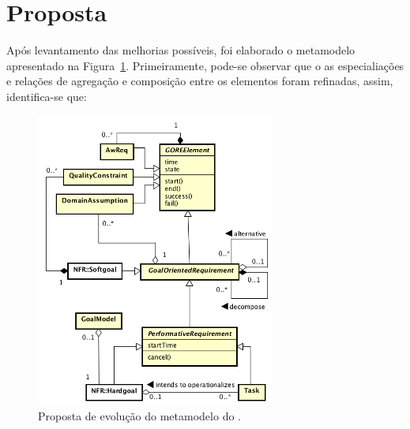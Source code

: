 \section{Proposta}
\label{sec-zanshin-proposta}

Após levantamento das melhorias possíveis, foi elaborado o metamodelo apresentado na Figura~\ref{figura-metamodelo-novo}. Primeiramente, pode-se observar que o as especialiações e relações de agregação e composição entre os elementos foram refinadas, assim, identifica-se que:

\begin{figure}
	\centering
	\includegraphics[width=0.7\textwidth]{figuras/metamodelos/metamodelo-zanshin-novo.png}
	\caption{Proposta de evolução do metamodelo do \framework \zanshin.}
	\label{figura-metamodelo-novo}
\end{figure}

